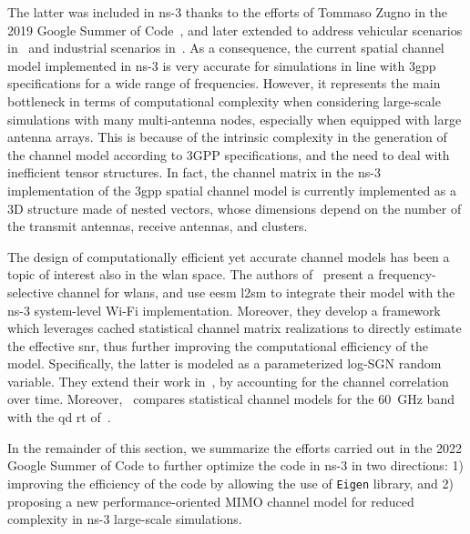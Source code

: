 The latter was included in ns-3 thanks to the efforts of Tommaso Zugno in the 2019 Google Summer of Code~\cite{tommaso:20}, and later extended to address vehicular scenarios in~\cite{10.1145/3460797.3460801} and industrial scenarios in~\cite{10.1145/3532577.3532596}. 
As a consequence, the current spatial channel model implemented in ns-3 is very accurate for simulations in line with \gls{3gpp} specifications for a wide range of frequencies. However, it represents the main bottleneck in terms of computational complexity when considering large-scale simulations with many multi-antenna nodes, especially when equipped with large antenna arrays. This is because of the intrinsic complexity in the generation of the channel model according to 3GPP specifications, and the need to deal with inefficient tensor structures. In fact, the channel matrix in the ns-3 implementation of the \gls{3gpp} spatial channel model is currently implemented as a 3D structure made of nested vectors, whose dimensions depend on the number of the transmit antennas, receive antennas, and clusters. %

The design of computationally efficient yet accurate channel models has been a topic of interest also in the \gls{wlan} space. The authors of~\cite{jin2020efficient, jin2021efficient} present a frequency-selective channel for \glspl{wlan}, and use \gls{eesm} \gls{l2sm} to integrate their model with the ns-3 system-level Wi-Fi implementation. Moreover, they develop a framework which leverages cached statistical channel matrix realizations to directly estimate the effective \gls{snr}, thus further improving the computational efficiency of the model. Specifically, the latter is modeled as a parameterized log-SGN random variable. They extend their work in~\cite{jin2021eesm}, by accounting for the channel correlation over time. 
Moreover,~\cite{liu2021performance} compares statistical channel models for the 60~GHz band with the \gls{qd} \gls{rt} of~\cite{QD}.

In the remainder of this section, we summarize the efforts carried out in the 2022 Google Summer of Code to further optimize the code in ns-3 in two directions: 1) improving the efficiency of the code by allowing the use of \texttt{Eigen} library, and 2) proposing a new performance-oriented MIMO channel model for reduced complexity in ns-3 large-scale simulations. 

